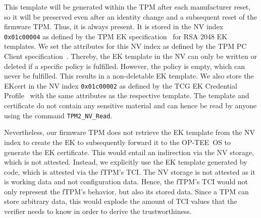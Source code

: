 This template will be generated within the TPM after each manufacturer reset, so it will be preserved even after an identity change and a subsequent reset of the firmware TPM\@.
Thus, it is always present.
It is stored in the NV index \texttt{0x01c00004} as defined by the TPM EK specification~\cite{tcg-ek} for RSA 2048 EK templates.
We set the attributes for this NV index as defined by the TPM PC Client specification~\cite{tcgPcClient}. %
Thereby, the EK template in the NV can only be written or deleted if a specific policy is fulfilled.
However, the policy is empty, which can never be fulfilled.
This results in a non-deletable EK template.
We also store the EKcert in the NV index \texttt{0x01c00002} as defined by the TCG EK Credential Profile~\cite{tcg-ek} with the same attributes as the respective template.
The template and certificate do not contain any sensitive material and can hence be read by anyone using the command \texttt{TPM2\_NV\_Read}.

Nevertheless, our firmware TPM does not retrieve the EK template from the NV index to create the EK to subsequently forward it to the OP-TEE~OS to generate the EK certificate.
This would entail an indirection via the NV storage, which is not attested.
Instead, we explicitly use the EK template generated by code, which is attested via the fTPM's TCI\@.
The NV storage is not attested as it is working data and not configuration data.
Hence, the fTPM's TCI would not only represent the fTPM's behavior, but also its stored data.
Since a TPM can store arbitrary data, this would explode the amount of TCI values that the verifier needs to know in order to derive the trustworthiness.



